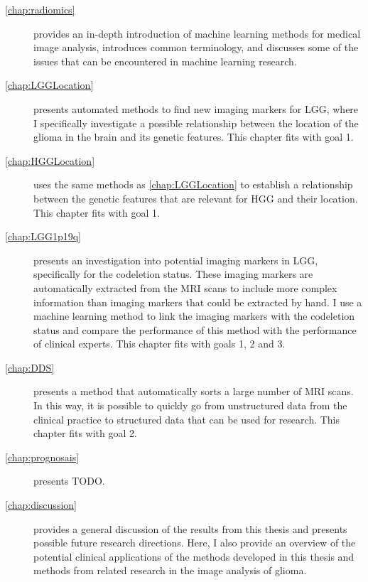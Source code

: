 \begin{description}
    \item[\cref{chap:radiomics}] provides an in-depth introduction of machine learning methods for medical image analysis, introduces common terminology, and discusses some of the issues that can be encountered in machine learning research.

    \item[\cref{chap:LGGLocation}] presents automated methods to find new imaging markers for \gls{LGG}, where I specifically investigate a possible relationship between the location of the \gls{glioma} in the brain and its genetic features.
    This chapter fits with goal 1.

    \item[\cref{chap:HGGLocation}] uses the same methods as \cref{chap:LGGLocation} to establish a relationship between the genetic features that are relevant for \gls{HGG} and their location.
    This chapter fits with goal 1.

    \item[\cref{chap:LGG1p19q}] presents an investigation into potential imaging markers in \gls{LGG}, specifically for the \gls{codeletion} status.
    These imaging markers are automatically extracted from the \gls{MRI} scans to include more complex information than imaging markers that could be extracted by hand.
    I use a machine learning method to link the imaging markers with the \gls{codeletion} status and compare the performance of this method with the performance of clinical experts.
    This chapter fits with goals 1, 2 and 3.

    \item[\cref{chap:DDS}] presents a method that automatically sorts a large number of \gls{MRI} scans.
    In this way, it is possible to quickly go from unstructured data from the clinical practice to structured data that can be used for research.
    This chapter fits with goal 2.

    \item[\cref{chap:prognosais}] presents TODO.

    \item[\cref{chap:discussion}] provides a general discussion of the results from this thesis and presents possible future research directions.
    Here, I also provide an overview of the potential clinical applications of the methods developed in this thesis and methods from related research in the image analysis of glioma.

\end{description}


